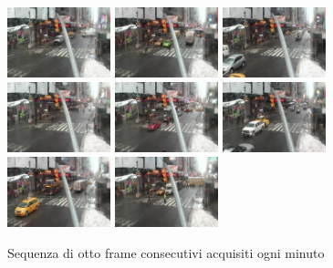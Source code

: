 \begin{figure}
	\centering
	\includegraphics[width=3cm]{./pictures/image0001.eps}
	\includegraphics[width=3cm]{./pictures/image0002.eps}
	\includegraphics[width=3cm]{./pictures/image0003.eps}
	\includegraphics[width=3cm]{./pictures/image0004.eps}
	\includegraphics[width=3cm]{./pictures/image0005.eps}
	\includegraphics[width=3cm]{./pictures/image0006.eps}
	\includegraphics[width=3cm]{./pictures/image0007.eps}
	\includegraphics[width=3cm]{./pictures/image0008.eps}
	\caption{Sequenza di otto frame consecutivi acquisiti ogni minuto}
	\label{fig:framDifferences}
\end{figure}
